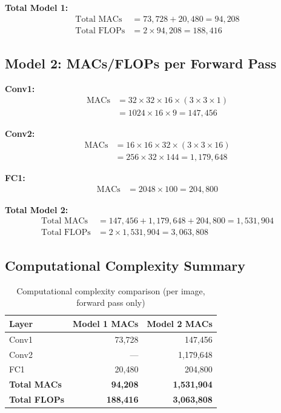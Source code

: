 \documentclass[11pt,a4paper]{article}
\begin{document}
\textbf{Total Model 1:}
\begin{align*}
\text{Total MACs} &= 73,728 + 20,480 = \boxed{94,208} \\
\text{Total FLOPs} &= 2 \times 94,208 = \boxed{188,416}
\end{align*}

\subsection{Model 2: MACs/FLOPs per Forward Pass}

\textbf{Conv1:}
\begin{align*}
\text{MACs} &= 32 \times 32 \times 16 \times (3 \times 3 \times 1) \\
&= 1024 \times 16 \times 9 = 147,456
\end{align*}

\textbf{Conv2:}
\begin{align*}
\text{MACs} &= 16 \times 16 \times 32 \times (3 \times 3 \times 16) \\
&= 256 \times 32 \times 144 = 1,179,648
\end{align*}

\textbf{FC1:}
\begin{align*}
\text{MACs} &= 2048 \times 100 = 204,800
\end{align*}

\textbf{Total Model 2:}
\begin{align*}
\text{Total MACs} &= 147,456 + 1,179,648 + 204,800 = \boxed{1,531,904} \\
\text{Total FLOPs} &= 2 \times 1,531,904 = \boxed{3,063,808}
\end{align*}

\subsection{Computational Complexity Summary}
\begin{table}[H]
\centering
\begin{tabular}{lrr}
\toprule
\textbf{Layer} & \textbf{Model 1 MACs} & \textbf{Model 2 MACs} \\
\midrule
Conv1 & 73,728 & 147,456 \\
Conv2 & --- & 1,179,648 \\
FC1 & 20,480 & 204,800 \\
\midrule
\textbf{Total MACs} & \textbf{94,208} & \textbf{1,531,904} \\
\textbf{Total FLOPs} & \textbf{188,416} & \textbf{3,063,808} \\
\bottomrule
\end{tabular}
\caption{Computational complexity comparison (per image, forward pass only)}
\end{table}
\end{document}
